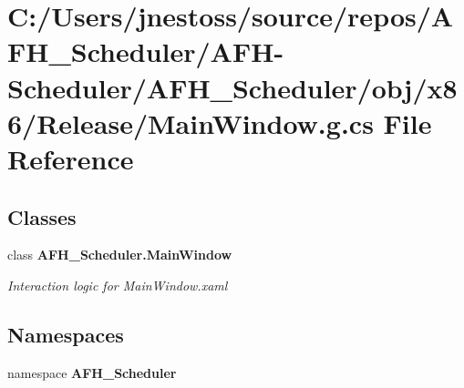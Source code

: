 \section{C\+:/\+Users/jnestoss/source/repos/\+A\+F\+H\+\_\+\+Scheduler/\+A\+F\+H-\/\+Scheduler/\+A\+F\+H\+\_\+\+Scheduler/obj/x86/\+Release/\+Main\+Window.g.\+cs File Reference}
\label{x86_2_release_2_main_window_8g_8cs}
\subsection*{Classes}
\begin{DoxyCompactItemize}
\item 
class \textbf{ A\+F\+H\+\_\+\+Scheduler.\+Main\+Window}
\begin{DoxyCompactList}\small\item\em Interaction logic for Main\+Window.\+xaml \end{DoxyCompactList}\end{DoxyCompactItemize}
\subsection*{Namespaces}
\begin{DoxyCompactItemize}
\item 
namespace \textbf{ A\+F\+H\+\_\+\+Scheduler}
\end{DoxyCompactItemize}
